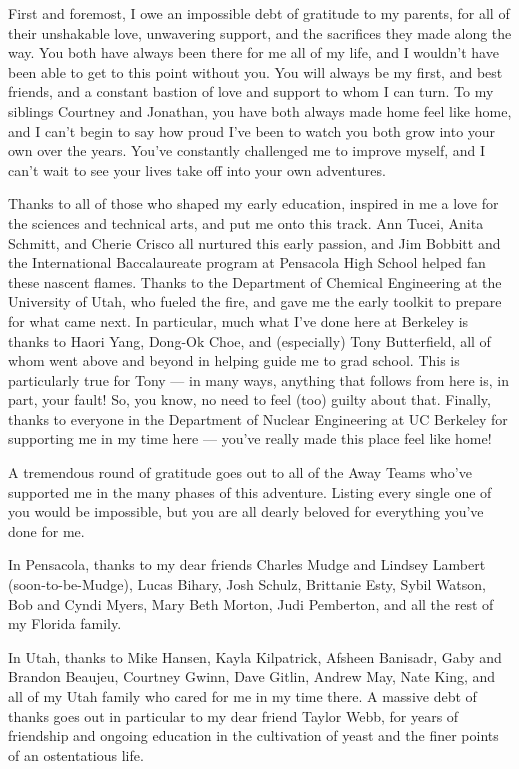 \documentclass[
]{ucbthesis}
\begin{document}
\begin{frontmatter}
\begin{acknowledgements}
First and foremost, I owe an impossible debt of gratitude to my parents, for all of their unshakable love, unwavering support, and the sacrifices they made along the way. 
You both have always been there for me all of my life, and I wouldn't have been able to get to this point without you.
You will always be my first, and best friends, and a constant bastion of love and support to whom I can turn.
To my siblings Courtney and Jonathan, you have both always made home feel like home, and I can't begin to say how proud I've been to watch you both grow into your own over the years.
You've constantly challenged me to improve myself, and I can't wait to see your lives take off into your own adventures.





Thanks to all of those who shaped my early education, inspired in me a love for the sciences and technical arts, and put me onto this track.
Ann Tucei, Anita Schmitt, and Cherie Crisco all nurtured this early passion, and Jim Bobbitt and the International Baccalaureate program at Pensacola High School helped fan these nascent flames.
Thanks to the Department of Chemical Engineering at the University of Utah, who fueled the fire, and gave me the early toolkit to prepare for what came next.
In particular, much what I've done here at Berkeley is thanks to Haori Yang, Dong-Ok Choe, and (especially) Tony Butterfield, all of whom went above and beyond in helping guide me to grad school.
This is particularly true for Tony --- in many ways, anything that follows from here is, in part, your fault!
So, you know, no need to feel (too) guilty about that.
Finally, thanks to everyone in the Department of Nuclear Engineering at UC Berkeley for supporting me in my time here --- you've really made this place feel like home!


A tremendous round of gratitude goes out to all of the Away Teams who've supported me in the many phases of this adventure. 
Listing every single one of you would be impossible, but you are all dearly beloved for everything you've done for me.

In Pensacola, thanks to my dear friends Charles Mudge and Lindsey Lambert (soon-to-be-Mudge), Lucas Bihary, Josh Schulz, Brittanie Esty, Sybil Watson, Bob and Cyndi Myers, Mary Beth Morton, Judi Pemberton,    and all the rest of my Florida family.


In Utah, thanks to Mike Hansen, Kayla Kilpatrick, Afsheen Banisadr, Gaby and Brandon Beaujeu, Courtney Gwinn, Dave Gitlin, Andrew May, Nate King, and all of my Utah family who cared for me in my time there.
A massive debt of thanks goes out in particular to my dear friend Taylor Webb, for years of friendship and ongoing education in the cultivation of yeast and the finer points of an ostentatious life.



\end{acknowledgements}
\end{frontmatter}
\end{document}

